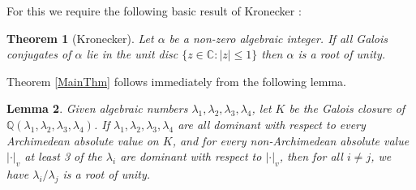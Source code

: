 \documentclass{article}\usepackage[a4paper,margin=20mm]{geometry}
\newtheorem{theorem}{Theorem}\newtheorem{lemma}[theorem]{Lemma}\newtheorem{proposition}[theorem]{Proposition}\newtheorem{corollary}[theorem]{Corollary}\newtheorem{definition}[theorem]{Definition}\newtheorem{claim}[theorem]{Claim}\newtheorem{remark}[theorem]{Remark}\newtheorem{observation}[theorem]{Observation}\newtheorem{conjecture}[theorem]{Conjecture}\newtheorem{example}[theorem]{Example}
\newcommand{\Q}{\mathbb{Q}}
\begin{document}
For this we require the following basic result of Kronecker \cite{Kronecker}:
\begin{theorem}[Kronecker] \label{Kronecker}
	Let $\alpha$ be a non-zero algebraic integer. If all Galois conjugates of $\alpha$ lie in the unit disc $\{z \in \mathbb C : |z| \leq 1\}$ then $\alpha$ is a root of unity.
\end{theorem}
Theorem \ref{MainThm} follows immediately from the following lemma.
\begin{lemma} \label{MainLemma}
Given algebraic numbers $\lambda_1, \lambda_2, \lambda_3, \lambda_4$, let $K$ be the Galois closure of $\Q(\lambda_1, \lambda_2, \lambda_3, \lambda_4)$. If $\lambda_1, \lambda_2, \lambda_3, \lambda_4$ are all dominant with respect to every Archimedean absolute value on $K$, and for every non-Archimedean absolute value $|\cdot|_v$ at least 3 of the $\lambda_i$ are dominant with respect to $|\cdot|_v$, then for all $i \neq j$, we have $\lambda_i/\lambda_j$ is a root of unity. 
\end{lemma}
\end{document}
